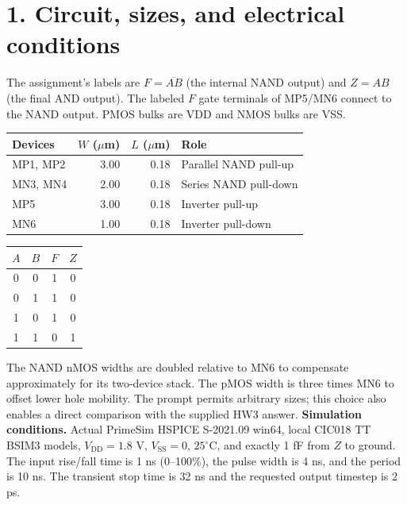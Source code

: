 \documentclass[11pt,a4paper]{article}
\newcommand{\VDD}{V_{\mathrm{DD}}}
\newcommand{\VSS}{V_{\mathrm{SS}}}
\newcommand{\MOS}[5]{
  \coordinate (#1) at (#2,#3);
  \coordinate (#1t) at ($(#1)+(0,.55)$);
  \coordinate (#1b) at ($(#1)+(0,-.55)$);
  \draw (#1t)--($(#1)+(0,.30)$)--($(#1)+(-.18,.30)$);
  \draw ($(#1)+(-.18,.34)$)--($(#1)+(-.18,-.34)$);
  \draw ($(#1)+(-.18,-.30)$)--($(#1)+(0,-.30)$)--(#1b);
  \draw ($(#1)+(-.35,.33)$)--($(#1)+(-.35,-.33)$);
  \def\type{#5}\def\ptype{p}
  \ifx\type\ptype
    \draw ($(#1)+(-.78,0)$)--($(#1)+(-.53,0)$);
    \draw ($(#1)+(-.465,0)$) circle (.065);
    \draw ($(#1)+(-.40,0)$)--($(#1)+(-.35,0)$);
  \else
    \draw ($(#1)+(-.78,0)$)--($(#1)+(-.35,0)$);
  \fi
  \node[anchor=east] at ($(#1)+(-.82,0)$) {$#4$};
  \node[anchor=west,font=\scriptsize] at ($(#1)+(.10,0)$) {#1};
}
\begin{document}
\section*{1. Circuit, sizes, and electrical conditions}
The assignment's labels are $F=\overline{AB}$ (the internal NAND output) and $Z=AB$ (the final AND output). The labeled $F$ gate terminals of MP5/MN6 connect to the NAND output. PMOS bulks are VDD and NMOS bulks are VSS.
\begin{center}\end{center}
\begin{center}\begin{tabular}{lrrl}\toprule
Devices&$W$ ($\mu$m)&$L$ ($\mu$m)&Role\\\midrule
MP1, MP2&3.00&0.18&Parallel NAND pull-up\\
MN3, MN4&2.00&0.18&Series NAND pull-down\\
MP5&3.00&0.18&Inverter pull-up\\
MN6&1.00&0.18&Inverter pull-down\\\bottomrule
\end{tabular}\qquad\begin{tabular}{cc|cc}\toprule
$A$&$B$&$F$&$Z$\\\midrule0&0&1&0\\0&1&1&0\\1&0&1&0\\1&1&0&1\\\bottomrule
\end{tabular}\end{center}
The NAND nMOS widths are doubled relative to MN6 to compensate approximately for its two-device stack. The pMOS width is three times MN6 to offset lower hole mobility. The prompt permits arbitrary sizes; this choice also enables a direct comparison with the supplied HW3 answer.
\textbf{Simulation conditions.} Actual PrimeSim HSPICE S-2021.09 win64, local CIC018 TT BSIM3 models, $\VDD=1.8$ V, $\VSS=0$, $25^\circ$C, and exactly 1 fF from $Z$ to ground. The input rise/fall time is 1 ns (0--100\%), the pulse width is 4 ns, and the period is 10 ns. The transient stop time is 32 ns and the requested output timestep is 2 ps.
\end{document}
